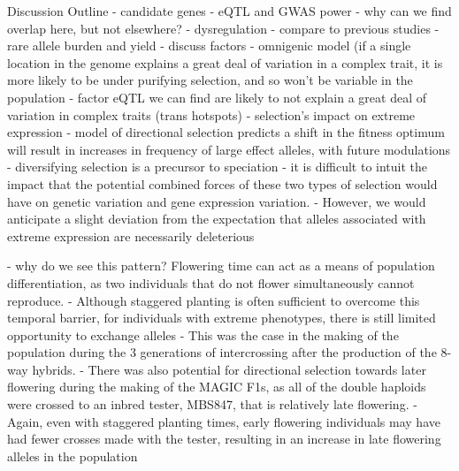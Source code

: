 \documentclass[article,9pt,twocolumn,twoside]{rilabRxiv}
\begin{document}
Discussion Outline
- candidate genes
    - eQTL and GWAS power
    - why can we find overlap here, but not elsewhere?
- dysregulation
    - compare to previous studies
    - rare allele burden and yield
    - discuss factors - omnigenic model (if a single location in the genome explains a great deal of variation in a complex trait, it is more likely to be under purifying selection, and so won't be variable in the population
    - factor eQTL we can find are likely to not explain a great deal of variation in complex traits (trans hotspots)
- selection's impact on extreme expression
    - model of directional selection predicts a shift in the fitness optimum will result in increases in frequency of large effect alleles, with future modulations
    - diversifying selection is a precursor to speciation
    - it is difficult to intuit the impact that the potential combined forces of these two types of selection would have on genetic variation and gene expression variation.
    - However, we would anticipate a slight deviation from the expectation that alleles associated with extreme expression are necessarily deleterious
    
    - why do we see this pattern? Flowering time can act as a means of population differentiation, as two individuals that do not flower simultaneously cannot reproduce.
    - Although staggered planting is often sufficient to overcome this temporal barrier, for individuals with extreme phenotypes, there is still limited opportunity to exchange alleles
    - This was the case in the making of the population during the 3 generations of intercrossing after the production of the 8-way hybrids.
    - There was also potential for directional selection towards later flowering during the making of the MAGIC F1s, as all of the double haploids were crossed to an inbred tester, MBS847, that is relatively late flowering. 
    - Again, even with staggered planting times, early flowering individuals may have had fewer crosses made with the tester, resulting in an increase in late flowering alleles in the population
\end{document}
